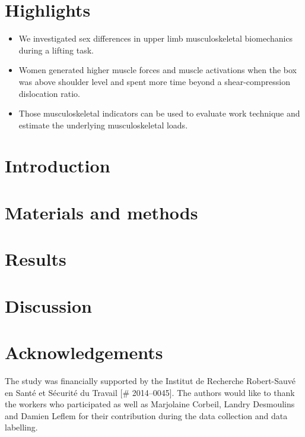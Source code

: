 \documentclass[preprint,review,12pt]{elsarticle}
\begin{document}
    \section{Highlights}\label{sec:highlights}
    \begin{itemize}
        \item We investigated sex differences in upper limb musculoskeletal biomechanics during a lifting task.
        \item Women generated higher muscle forces and muscle activations when the box was above shoulder level and spent more time beyond a shear-compression dislocation ratio.
        \item Those musculoskeletal indicators can be used to evaluate work technique and estimate the underlying musculoskeletal loads.
    \end{itemize}


    \section{Introduction}\label{sec:introduction}
    

    \section{Materials and methods}\label{sec:materials-and-methods}
    

    \section{Results}\label{sec:results}
    

    \section{Discussion}\label{sec:discussion}
    

    \section{Acknowledgements}\label{sec:acknowledgements}

    The study was financially supported by the Institut de Recherche Robert-Sauvé en Santé et Sécurité du Travail [\# 2014--0045].
    The authors would like to thank the workers who participated as well as Marjolaine Corbeil, Landry Desmoulins and Damien Leflem for their contribution during the data collection and data labelling.

    \appendix
    

    
    
\end{document}
